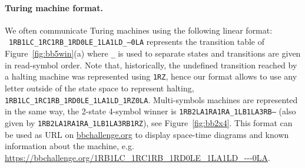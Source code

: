 

\paragraph*{Turing machine format.} We often communicate Turing machines using the following linear format: \\ \texttt{1RB1LC\_1RC1RB\_1RD0LE\_1LA1LD\_---0LA} represents the transition table of Figure~\ref{fig:bb5win}(a) where \texttt{\_} is used to separate states and transitions are given in read-symbol order. Note that, historically, the undefined transition reached by a halting machine was represented using \texttt{1RZ}, hence our format allows to use any letter outside of the state space to represent halting, \eg \texttt{1RB1LC\_1RC1RB\_1RD0LE\_1LA1LD\_1RZ0LA}. Multi-symbols machines are represented in the same way, \eg the 2-state 4-symbol \BBfull winner is \texttt{1RB2LA1RA1RA\_1LB1LA3RB---} (also given by \texttt{1RB2LA1RA1RA\_1LB1LA3RB1RZ}), see Figure~\ref{fig:bb2x4}. This format can be used as URL on \url{bbchallenge.org} to display space-time diagrams and known information about the machine, e.g. \url{https://bbchallenge.org/1RB1LC\_1RC1RB\_1RD0LE\_1LA1LD\_---0LA}.

